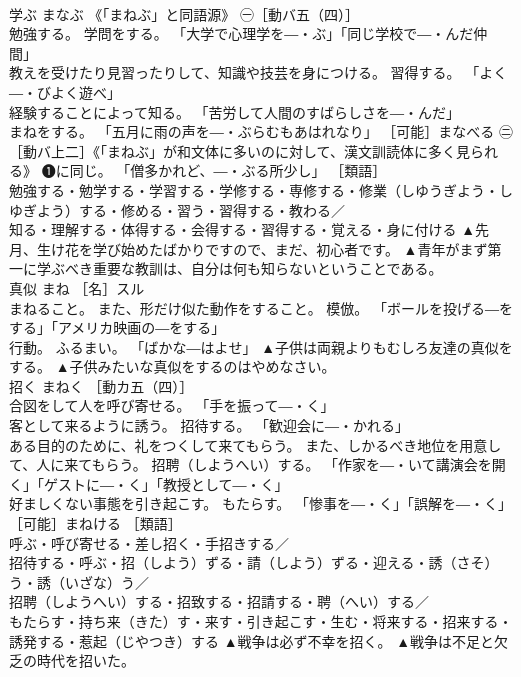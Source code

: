 \documentclass[8pt]{extreport}
\begin{document}
\begin{CJK}{UTF8}{min}
\\	学ぶ	まなぶ	《「まねぶ」と同語源》 ㊀［動バ五（四）］ 
\\	勉強する。 学問をする。 「大学で心理学を―・ぶ」「同じ学校で―・んだ仲間」 
\\	教えを受けたり見習ったりして、知識や技芸を身につける。 習得する。 「よく―・びよく遊べ」 
\\	経験することによって知る。 「苦労して人間のすばらしさを―・んだ」 
\\	まねをする。 「五月に雨の声を―・ぶらむもあはれなり」 ［可能］まなべる ㊁［動バ上二］《「まねぶ」が和文体に多いのに対して、漢文訓読体に多く見られる》 ❶に同じ。 「僧多かれど、―・ぶる所少し」 ［類語］ 
\\	勉強する・勉学する・学習する・学修する・専修する・修業（しゆうぎよう・しゆぎよう）する・修める・習う・習得する・教わる／
\\	知る・理解する・体得する・会得する・習得する・覚える・身に付ける	▲先月、生け花を学び始めたばかりですので、まだ、初心者です。 ▲青年がまず第一に学ぶべき重要な教訓は、自分は何も知らないということである。
\\	真似	まね	［名］スル 
\\	まねること。 また、形だけ似た動作をすること。 模倣。 「ボールを投げる―をする」「アメリカ映画の―をする」 
\\	行動。 ふるまい。 「ばかな―はよせ」	▲子供は両親よりもむしろ友達の真似をする。 ▲子供みたいな真似をするのはやめなさい。
\\	招く	まねく	［動カ五（四）］ 
\\	合図をして人を呼び寄せる。 「手を振って―・く」 
\\	客として来るように誘う。 招待する。 「歓迎会に―・かれる」 
\\	ある目的のために、礼をつくして来てもらう。 また、しかるべき地位を用意して、人に来てもらう。 招聘（しようへい）する。 「作家を―・いて講演会を開く」「ゲストに―・く」「教授として―・く」 
\\	好ましくない事態を引き起こす。 もたらす。 「惨事を―・く」「誤解を―・く」 ［可能］まねける ［類語］
\\	呼ぶ・呼び寄せる・差し招く・手招きする／
\\	招待する・呼ぶ・招（しよう）ずる・請（しよう）ずる・迎える・誘（さそ）う・誘（いざな）う／
\\	招聘（しようへい）する・招致する・招請する・聘（へい）する／
\\	もたらす・持ち来（きた）す・来す・引き起こす・生む・将来する・招来する・誘発する・惹起（じやつき）する	▲戦争は必ず不幸を招く。 ▲戦争は不足と欠乏の時代を招いた。

\end{CJK}
\end{document}

